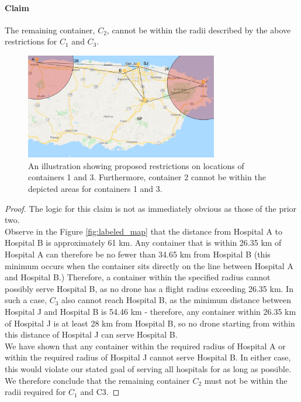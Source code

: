 \paragraph{Claim} The remaining container, $C_2$, cannot be within the radii described by the above restrictions for $C_1$ and $C_3$.

\begin{figure}[!ht]
    \centering
    \includegraphics[width=0.75\textwidth]{2_4.png}
    \caption{An illustration showing proposed restrictions on locations of containers 1 and 3. Furthermore, container 2 cannot be within the depicted areas for containers 1 and 3.}
    \label{fig:2_4_map}
\end{figure}
\begin{proof}
The logic for this claim is not as immediately obvious as those of the prior two. \\
Observe in the Figure \ref{fig:labeled_map} that the distance from Hospital A to Hospital B is approximately 61 km. Any container that is within 26.35 km of Hospital A can therefore be no fewer than 34.65 km from Hospital B (this minimum occurs when the container sits directly on the line between Hospital A and Hospital B.) Therefore, a container within the specified radius cannot possibly serve Hospital B, as no drone has a flight radius exceeding 26.35 km. In such a case, $C_3$ also cannot reach Hospital B, as the minimum distance between Hospital J and Hospital B is 54.46 km - therefore, any container within 26.35 km of Hospital J is at least 28 km from Hospital B, so no drone starting from within this distance of Hospital J can serve Hospital B. \\
We have shown that any container within the required radius of Hospital A or within the required radius of Hospital J cannot serve Hospital B. In either case, this would violate our stated goal of serving all hospitals for as long as possible. We therefore conclude that the remaining container $C_2$ must not be within the radii required for $C_1$ and C3.
\end{proof}  

